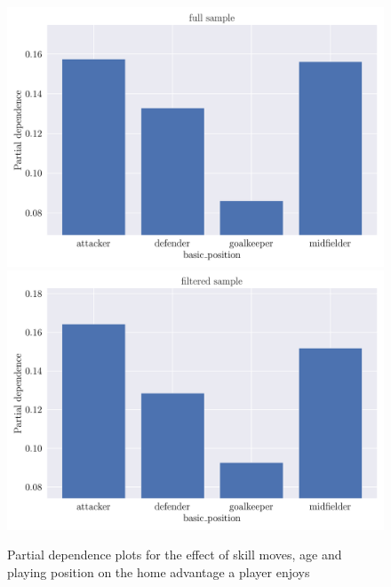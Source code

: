 \begin{figure}
    \includegraphics[width=0.49\linewidth]{attachments/machine-learning/pd_pos_rf_full_sample.png}
    \includegraphics[width=0.49\linewidth]{attachments/machine-learning/pd_pos_rf_filtered_sample.png}
    \caption{Partial dependence plots for the effect of skill moves, age and playing position on the home advantage a player enjoys}
    \label{fig:pd_plots_2}
\end{figure}